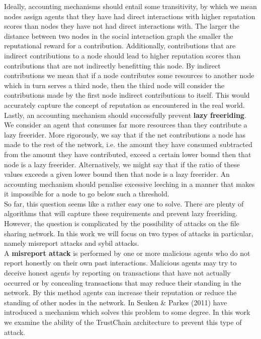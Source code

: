 \noindent{}Ideally, accounting mechanisms should entail some transitivity, by which we mean nodes assign agents that they have had direct interactions with higher reputation scores than nodes they have not had direct interactions with. The larger the distance between two nodes in the social interaction graph the smaller the reputational reward for a contribution. Additionally, contributions that are indirect contributions to a node should lead to higher reputation scores than contributions that are not indirectly benefitting this node. By indirect contributions we mean that if a node contributes some resources to another node which in turn serves a third node, then the third node will consider the contributions made by the first node indirect contributions to itself. This would accurately capture the concept of reputation as encountered in the real world. \vspace{1em}\\ 

\noindent{}Lastly, an accounting mechanism should successfully prevent \textbf{lazy freeriding}. We consider an agent that consumes far more resources than they contribute a lazy freerider. More rigorously, we say that if the net contributions a node has made to the rest of the network, i.e. the amount they have consumed subtracted from the amount they have contributed, exceed a certain lower bound then that node is a lazy freerider. Alternatively, we might say that if the ratio of these values exceeds a given lower bound then that node is a lazy freerider. An accounting mechanism should penalise excessive leeching in a manner that makes it impossible for a node to go below such a threshold.\vspace{1em}\\

\noindent{}So far, this question seems like a rather easy one to solve. There are plenty of algorithms that will capture these requirements and prevent lazy freeriding. However, the question is complicated by the possibility of attacks on the file sharing network. In this work we will focus on two types of attacks in particular, namely misreport attacks and sybil attacks. \vspace{1em}\\


\noindent{}A {\bf misreport attack} is performed by one or more malicious agents who do not report honestly on their own past interactions. Malicious agents may try to deceive honest agents by reporting on transactions that have not actually occurred or by concealing transactions  that may reduce their standing in the network. By this method agents can increase their reputation or reduce the standing of other nodes in the network. In \cite{Accounting Mechanisms for Distributed Work Systems} Seuken \& Parkes (2011) have introduced a mechanism which solves this problem to some degree. In this work we examine the ability of the TrustChain architecture to prevent this type of attack. \vspace{1em}\\ 

